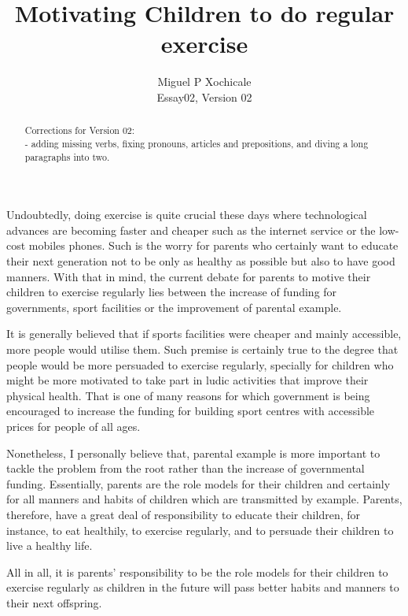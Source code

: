 \documentclass[11pt]{article}
\title{Motivating Children to do regular exercise}
\author{Miguel P Xochicale \\
Essay02, Version 02}
\date{ }
\begin{document}
\maketitle
\thispagestyle{empty} %

\begin{abstract}
Corrections for Version 02:\\
- adding missing verbs, fixing pronouns, articles and prepositions, and diving a long paragraphs into two.
\end{abstract}


Undoubtedly, doing exercise is quite crucial these days where technological advances
are becoming faster and cheaper such as the internet service or the low-cost mobiles phones. 
Such is the worry for parents who certainly want to educate their next generation
not to be only as healthy as possible but also to have good  manners. With that in mind, 
the current debate for parents to motive their children to exercise regularly lies 
between the increase of funding for governments, sport facilities or the improvement 
of parental example.

It is generally believed that if sports facilities were cheaper and mainly accessible, 
more people would utilise them.
Such premise is certainly true to the degree that people would be more persuaded 
to exercise regularly, specially for children who might be more motivated 
to take part in ludic activities that improve their physical health. 
That is one of many reasons for which government is being encouraged to increase 
the funding for building sport centres with accessible prices for people of all ages.

Nonetheless, I personally believe that, parental example is more important to tackle 
the problem from the root rather than the increase of governmental funding. 
Essentially, parents are the role models for their children and certainly for all 
manners and habits of children which are transmitted by example.
Parents, therefore, have a great deal of responsibility to educate their children,
for instance, to eat healthily, to exercise regularly, and to persuade their children 
to live a healthy life.

All in all, it is parents' responsibility to be the role models for their children
to exercise regularly as children in the future will pass better habits and manners 
to their next offspring.
\end{document}
